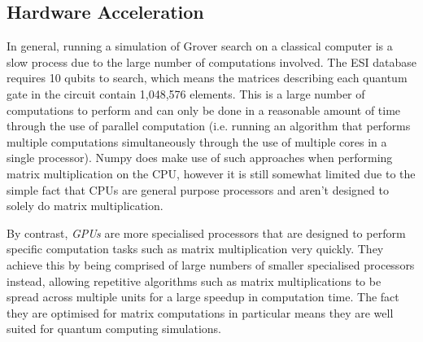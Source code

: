 \documentclass{article}[11pt]
\begin{document}
\subsection{Hardware Acceleration}
In general, running a simulation of Grover search on a classical computer is a slow process due to the large number of computations involved. The ESI database requires 10 qubits to search, which means the matrices describing each quantum gate in the circuit contain 1,048,576 elements. This is a large number of computations to perform and can only be done in a reasonable amount of time through the use of parallel computation (i.e. running an algorithm that performs multiple computations simultaneously through the use of multiple cores in a single processor). Numpy does make use of such approaches when performing matrix multiplication on the CPU,\cite{numpy} however it is still somewhat limited due to the simple fact that CPUs are general purpose processors and aren't designed to solely do matrix multiplication.

By contrast, \emph{GPUs} are more specialised processors that are designed to perform specific computation tasks such as matrix multiplication very quickly. They achieve this by being comprised of large numbers of smaller specialised processors instead, allowing repetitive algorithms such as matrix multiplications to be spread across multiple units for a large speedup in computation time.\cite{cuda} The fact they are optimised for matrix computations in particular means they are well suited for quantum computing simulations.
\end{document}
